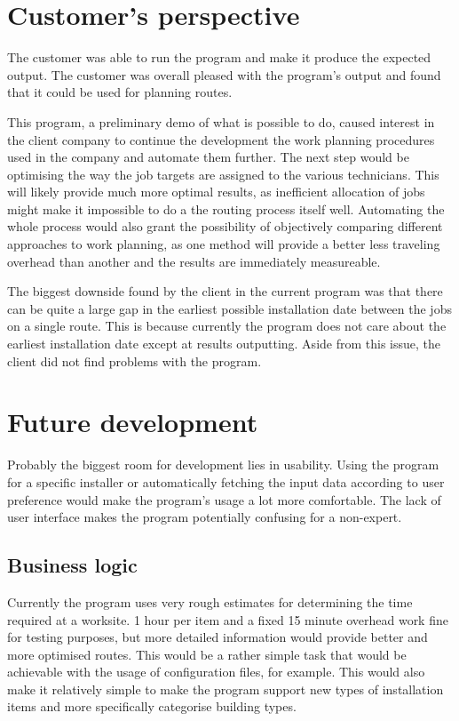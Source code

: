 \section{Customer's perspective}

The customer was able to run the program and make it produce the expected output. The customer was overall pleased with the program's output and found that it could be used for planning routes. 

This program, a preliminary demo of what is possible to do, caused interest in the client company to continue the development the work planning procedures used in the company and automate them further. The next step would be optimising the way the job targets are assigned to the various technicians. This will likely provide much more optimal results, as inefficient allocation of jobs might make it impossible to do a the routing process itself well. Automating the whole process would also grant the possibility of objectively comparing different approaches to work planning, as one method will provide a better less traveling overhead than another and the results are immediately measureable.   

The biggest downside found by the client in the current program was that there can be quite a large gap in the earliest possible installation date between the jobs on a single route. This is because currently the program does not care about the earliest installation date except at results outputting. Aside from this issue, the client did not find problems with the program. 



\section{Future development}

Probably the biggest room for development lies in usability. Using the program for a specific installer or automatically fetching the input data according to user preference would make the program's usage a lot more comfortable. The lack of user interface makes the program potentially confusing for a non-expert.


\subsection{Business logic}

Currently the program uses very rough estimates for determining the time required at a worksite. 1 hour per item and a fixed 15 minute overhead work fine for testing purposes, but more detailed information would provide better and more optimised routes. This would be a rather simple task that would be achievable with the usage of configuration files, for example. This would also make it relatively simple to make the program support new types of installation items and more specifically categorise building types.

